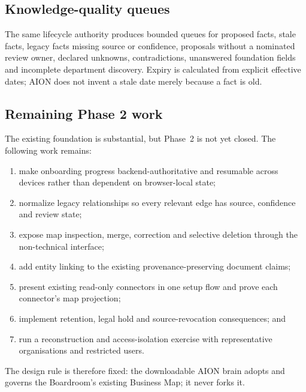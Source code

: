 \subsection{Knowledge-quality queues}

The same lifecycle authority produces bounded queues for proposed facts, stale
facts, legacy facts missing source or confidence, proposals without a nominated
review owner, declared unknowns, contradictions, unanswered foundation fields
and incomplete department discovery.  Expiry is calculated from explicit
effective dates; AION does not invent a stale date merely because a fact is old.

\subsection{Remaining Phase 2 work}

The existing foundation is substantial, but Phase~2 is not yet closed.  The
following work remains:

\begin{enumerate}
  \item make onboarding progress backend-authoritative and resumable across
  devices rather than dependent on browser-local state;
  \item normalize legacy relationships so every relevant edge has source,
  confidence and review state;
  \item expose map inspection, merge, correction and selective deletion through
  the non-technical interface;
  \item add entity linking to the existing provenance-preserving document claims;
  \item present existing read-only connectors in one setup flow and prove each
  connector's map projection;
  \item implement retention, legal hold and source-revocation consequences; and
  \item run a reconstruction and access-isolation exercise with representative
  organisations and restricted users.
\end{enumerate}

The design rule is therefore fixed: the downloadable AION brain adopts and
governs the Boardroom's existing Business Map; it never forks it.
